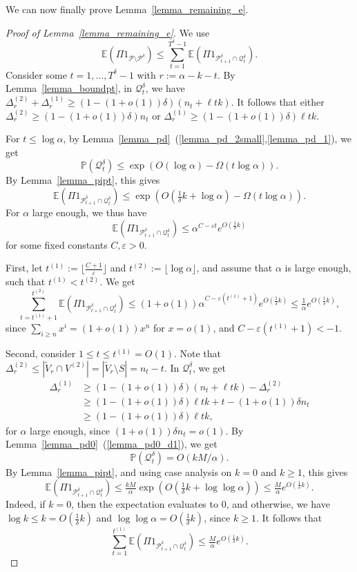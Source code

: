 \documentclass{article}
\theoremstyle{plain}
\theoremstyle{remark}
\theoremstyle{plain}
\numberwithin{equation}{section}
\begin{document}
	We can now finally prove Lemma~\ref{lemma_remaining_e}.
	
	\begin{proof}[Proof of Lemma~\ref{lemma_remaining_e}]
		We use $$\mathbb{E}(\Pi1_{\mathcal{P}\setminus\mathcal{P}^{\delta}})\leq\sum_{t=1}^{T^{\delta}-1}\mathbb{E}(\Pi1_{\mathcal{P}_{t+1}^{\delta}\cap\mathcal{Q}_t^{\delta}}).$$ Consider some $t=1,\ldots,T^{\delta}-1$ with $r:=\alpha-k-t$. By Lemma~\ref{lemma_boundpt}, in $\mathcal{Q}_t^{\delta}$, we have $\Delta_r^{(2)}+\Delta_r^{(1)}\geq(1-(1+o(1))\delta)(n_t+\ell tk)$. It follows that either $\Delta_r^{(2)}\geq(1-(1+o(1))\delta)n_t$ or $\Delta_r^{(1)}\geq(1-(1+o(1))\delta)\ell tk$.
		
		For $t\leq\log\alpha$, by Lemma~\ref{lemma_pd}~(\ref{lemma_pd_2small},\ref{lemma_pd_1}), we get $$\mathbb{P}(\mathcal{Q}_t^{\delta})\leq\exp\left(O(\log\alpha)-\Omega(t\log\alpha)\right).$$ By Lemma~\ref{lemma_pipt}, this gives $$\mathbb{E}(\Pi1_{\mathcal{P}_{t+1}^{\delta}\cap\mathcal{Q}_t^{\delta}})\leq\exp\left(O(\tfrac1{\delta}k+\log\alpha)-\Omega(t\log\alpha)\right).$$ For $\alpha$ large enough, we thus have $$\mathbb{E}(\Pi1_{\mathcal{P}_{t+1}^{\delta}\cap\mathcal{Q}_t^{\delta}})\leq\alpha^{C-\varepsilon t}e^{O(\frac1{\delta}k)}$$ for some fixed constants $C,\varepsilon>0$.
		
		First, let $t^{(1)}:=\lfloor\tfrac{C+1}{\varepsilon}\rfloor$ and $t^{(2)}:=\lfloor\log\alpha\rfloor$, and assume that $\alpha$ is large enough, such that $t^{(1)}<t^{(2)}$. We get $$\sum_{t=t^{(1)}+1}^{t^{(2)}}\mathbb{E}(\Pi1_{\mathcal{P}_{t+1}^{\delta}\cap\mathcal{Q}_t^{\delta}})\leq(1+o(1))\alpha^{C-\varepsilon(t^{(1)}+1)}e^{O(\frac1{\delta}k)}\leq\tfrac{1}{\alpha}e^{O(\frac1{\delta}k)},$$ since $\sum_{i\geq n}x^i=(1+o(1))x^n$ for $x=o(1)$, and $C-\varepsilon(t^{(1)}+1)<-1$.
		
		Second, consider $1\leq t\leq t^{(1)}=O(1)$. Note that $\Delta_r^{(2)}\leq|\widetilde{V}_r\cap V^{(2)}|=|\widetilde{V}_r\setminus S|=n_t-t$. In $\mathcal{Q}_t^{\delta}$, we get
		\begin{align}
			\Delta_r^{(1)}
			&\geq(1-(1+o(1))\delta)(n_t+\ell tk)-\Delta_r^{(2)}
			\\&\geq(1-(1+o(1))\delta)\ell tk+t-(1+o(1))\delta n_t
			\\&\geq(1-(1+o(1))\delta)\ell tk,
		\end{align}
		for $\alpha$ large enough, since $(1+o(1))\delta n_t=o(1)$. By Lemma~\ref{lemma_pd0}~(\ref{lemma_pd0_d1}), we get $$\mathbb{P}(\mathcal{Q}_t^{\delta})=O(kM/\alpha).$$ By Lemma~\ref{lemma_pipt}, and using case analysis on $k=0$ and $k\geq1$, this gives $$\mathbb{E}(\Pi1_{\mathcal{P}_{t+1}^{\delta}\cap\mathcal{Q}_t^{\delta}})\leq\tfrac{kM}{\alpha}\exp\left(O(\tfrac1{\delta}k+\log\log\alpha)\right)\leq\tfrac{M}{\alpha}e^{O(\frac1{\delta}k)}.$$ Indeed, if $k=0$, then the expectation evaluates to $0$, and otherwise, we have $\log k\leq k=O(\tfrac1{\delta}k)$ and $\log\log\alpha=O(\tfrac1{\delta}k)$, since $k\geq1$. It follows that $$\sum_{t=1}^{t^{(1)}}\mathbb{E}(\Pi1_{\mathcal{P}_{t+1}^{\delta}\cap\mathcal{Q}_t^{\delta}})\leq\tfrac{M}{\alpha}e^{O(\frac1{\delta}k)}.$$
		

\end{proof}
\end{document}
